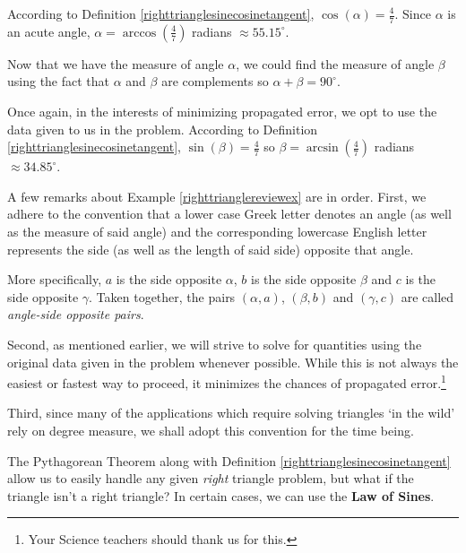 \documentclass{ximera}
\begin{document}
\begin{example}
\begin{explanation}
 

According to  Definition  \ref{righttrianglesinecosinetangent},  $\cos(\alpha) = \frac{4}{7}$.  Since $\alpha$ is an acute angle, $\alpha = \arccos\left(\frac{4}{7}\right)$ radians  $\approx 55.15^{\circ}$.  

 

Now that we have the measure of angle $\alpha$, we could find the measure of angle $\beta$ using the fact that $\alpha$ and $\beta$ are complements so $\alpha + \beta = 90^{\circ}$. 

 

Once again, in the interests of minimizing propagated error, we opt to use the data given to us in the problem. According to Definition  \ref{righttrianglesinecosinetangent},  $\sin(\beta) = \frac{4}{7}$ so $\beta = \arcsin\left(\frac{4}{7}\right)$ radians $\approx 34.85^{\circ}$.  

\end{explanation}
\end{example} 

A few remarks about Example \ref{righttrianglereviewex}  are in order.  First, we adhere to the convention that a lower case Greek letter denotes an angle (as well as the measure of said angle) and the corresponding lowercase English letter represents the side (as well as the length of said side) opposite that angle.  


More specifically, $a$ is the side opposite $\alpha$, $b$ is the side opposite $\beta$ and $c$ is the side opposite $\gamma$.  Taken together, the pairs $(\alpha, a)$, $(\beta, b)$ and $(\gamma, c)$ are called  \textit{angle-side opposite pairs}.  

 

Second, as mentioned earlier, we will strive to solve for quantities using the original data given in the problem whenever possible. While this is not always the easiest or fastest way to proceed, it minimizes the chances of propagated error.\footnote{Your Science teachers should thank us for this.}  

 

Third, since many of the  applications which require solving triangles `in the wild' rely on degree measure, we shall adopt this convention for the time being.

 

 The Pythagorean Theorem along with  Definition  \ref{righttrianglesinecosinetangent} allow us to easily handle any given \textit{right} triangle problem, but what if the triangle isn't a right triangle?  In certain cases, we can use the \textbf{Law of Sines}.
\end{document}
